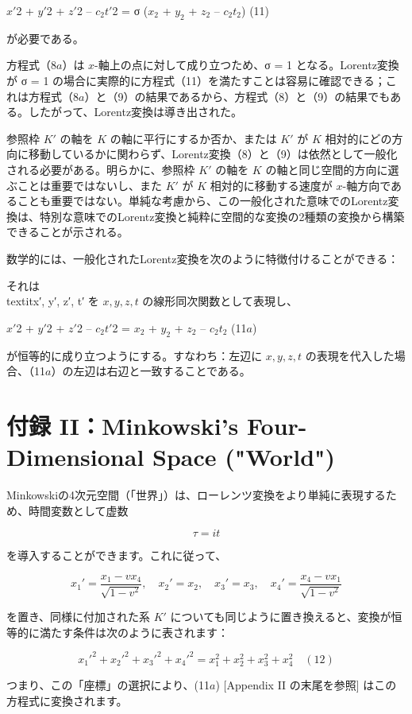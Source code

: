 \documentclass[a4paper,11pt,openany]{ltjsbook}
\begin{document}
$x′$2 + $y′$2 + $z′$2 – $c_{2}$$t′$2 = σ ($x_{2}$ + $y_{2}$ + $z_{2}$ – $c_{2}$$t_{2}$)
(11)

が必要である。

方程式（8$a$）は $x$-軸上の点に対して成り立つため、σ = 1 となる。Lorentz変換が σ = 1 の場合に実際的に方程式（11）を満たすことは容易に確認できる；これは方程式（8$a$）と（9）の結果であるから、方程式（8）と（9）の結果でもある。したがって、Lorentz変換は導き出された。

参照枠 $K′$ の軸を $K$ の軸に平行にするか否か、または $K′$ が $K$ 相対的にどの方向に移動しているかに関わらず、Lorentz変換（8）と（9）は依然として一般化される必要がある。明らかに、参照枠 $K′$ の軸を $K$ の軸と同じ空間的方向に選ぶことは重要ではないし、また $K′$ が $K$ 相対的に移動する速度が $x$-軸方向であることも重要ではない。単純な考慮から、この一般化された意味でのLorentz変換は、特別な意味でのLorentz変換と純粋に空間的な変換の2種類の変換から構築できることが示される。

数学的には、一般化されたLorentz変換を次のように特徴付けることができる：

それは \\textit{x′, y′, z′, t′} を $x, y, z, t$ の線形同次関数として表現し、

$x′$2 + $y′$2 + $z′$2 – $c_{2}$$t′$2 = $x_{2}$ + $y_{2}$ + $z_{2}$ – $c_{2}$$t_{2}$
(11$a$)

が恒等的に成り立つようにする。すなわち：左辺に $x, y, z, t$ の表現を代入した場合、（11$a$）の左辺は右辺と一致することである。


\clearpage
\chapter{付録 II：Minkowski's Four-Dimensional Space ("World")}

Minkowskiの4次元空間（「世界」）は、ローレンツ変換をより単純に表現するため、時間変数として虚数

\[
\tau = i t
\]

を導入することができます。これに従って、

\[
x_1' = \frac{x_1 - v x_4}{\sqrt{1 - v^2}}, \quad x_2' = x_2, \quad x_3' = x_3, \quad x_4' = \frac{x_4 - v x_1}{\sqrt{1 - v^2}}
\]

を置き、同様に付加された系 \(K'\) についても同じように置き換えると、変換が恒等的に満たす条件は次のように表されます：

\[
x_1'^2 + x_2'^2 + x_3'^2 + x_4'^2 = x_1^2 + x_2^2 + x_3^2 + x_4^2 \quad (12)
\]

つまり、この「座標」の選択により、(11$a$) [Appendix II の末尾を参照] はこの方程式に変換されます。
\end{document}
